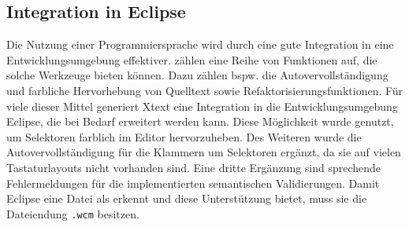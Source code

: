 \subsection{Integration in Eclipse}
    Die Nutzung einer Programmiersprache wird durch eine gute Integration in eine
    Entwicklungsumgebung effektiver.
    \citet[Kapitel 12.]{voelter:DslEngineering} zählen eine Reihe von
    Funktionen auf, die solche Werkzeuge bieten können.
    Dazu zählen bspw. die Autovervollständigung und farbliche Hervorhebung von Quelltext
    sowie Refaktorisierungsfunktionen.
    Für viele dieser Mittel generiert Xtext eine Integration
    in die Entwicklungsumgebung Eclipse,
    die bei Bedarf erweitert werden kann.
    Diese Möglichkeit wurde genutzt, um Selektoren farblich im Editor hervorzuheben.
    Des Weiteren wurde die Autovervollständigung für die Klammern um Selektoren ergänzt,
    da sie auf vielen Tastaturlayouts nicht vorhanden sind.
    Eine dritte Ergänzung sind sprechende Fehlermeldungen für die implementierten
    semantischen Validierungen.
    Damit Eclipse eine Datei als {\classificationModel} erkennt und diese Unterstützung bietet,
    muss sie die Dateiendung \texttt{.wcm} besitzen.
